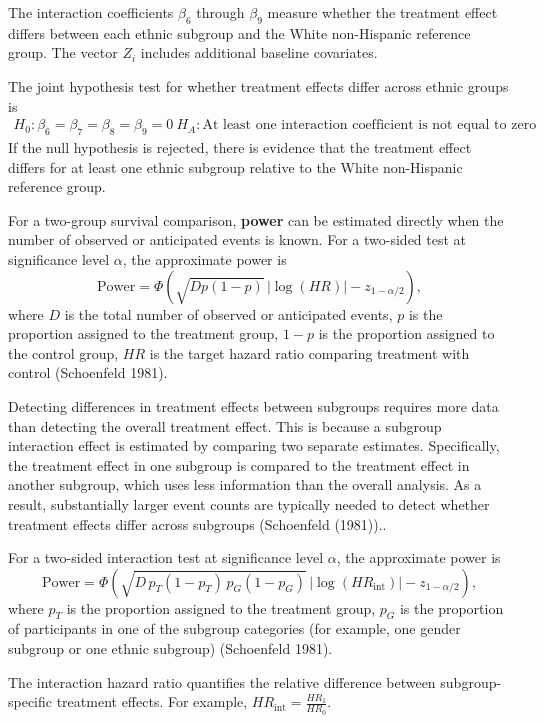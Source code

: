 \documentclass[
  letterpaper,
  DIV=11,
  numbers=noendperiod]{scrartcl}
\begin{document}
The interaction coefficients \(\beta_6\) through \(\beta_9\) measure
whether the treatment effect differs between each ethnic subgroup and
the White non-Hispanic reference group. The vector \(Z_i\) includes
additional baseline covariates.

The joint hypothesis test for whether treatment effects differ across
ethnic groups is \[
\begin{gathered}
H_0 : \beta_6 = \beta_7 = \beta_8 = \beta_9 = 0 \
H_A : \text{At least one interaction coefficient is not equal to zero}
\end{gathered}
\] If the null hypothesis is rejected, there is evidence that the
treatment effect differs for at least one ethnic subgroup relative to
the White non-Hispanic reference group.

For a two-group survival comparison, \textbf{power} can be estimated
directly when the number of observed or anticipated events is known. For
a two-sided test at significance level \(\alpha\), the approximate power
is \[
\text{Power}
=
\Phi\left(
\sqrt{D p(1-p)}\,|\log(HR)|
-
z_{1-\alpha/2}
\right),
\] where \(D\) is the total number of observed or anticipated events,
\(p\) is the proportion assigned to the treatment group, \(1-p\) is the
proportion assigned to the control group, \(HR\) is the target hazard
ratio comparing treatment with control (Schoenfeld 1981).

Detecting differences in treatment effects between subgroups requires
more data than detecting the overall treatment effect. This is because a
subgroup interaction effect is estimated by comparing two separate
estimates. Specifically, the treatment effect in one subgroup is
compared to the treatment effect in another subgroup, which uses less
information than the overall analysis. As a result, substantially larger
event counts are typically needed to detect whether treatment effects
differ across subgroups (Schoenfeld (1981))..

For a two-sided interaction test at significance level \(\alpha\), the
approximate power is \[
\text{Power}
=
\Phi\left(
\sqrt{
D \,
p_T(1-p_T)\,
p_G(1-p_G)
}
\,
|\log(HR_{\text{int}})|
-
z_{1-\alpha/2}
\right),
\] where \(p_T\) is the proportion assigned to the treatment group,
\(p_G\) is the proportion of participants in one of the subgroup
categories (for example, one gender subgroup or one ethnic subgroup)
(Schoenfeld 1981).

The interaction hazard ratio quantifies the relative difference between
subgroup-specific treatment effects. For example,
\(HR_{\text{int}} = \frac{HR_1}{HR_0}\).
\end{document}

